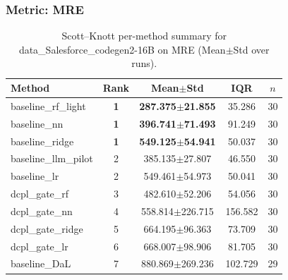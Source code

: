 \subsubsection*{Metric: MRE}
\begin{table}[H]
\centering
\scriptsize
\setlength{\tabcolsep}{4pt}
\renewcommand{\arraystretch}{1.1}
\caption{Scott--Knott per-method summary for data\_Salesforce\_codegen2-16B on MRE (Mean$\pm$Std over runs).}
\label{tab:sk_data_Salesforce_codegen2-16B_MRE}
\begin{tabular}{l|c|c|c|c}
\hline
\textbf{Method} & \textbf{Rank} & \textbf{Mean$\pm$Std} & \textbf{IQR} & \textbf{$n$} \\
\hline
\rowcolor{red!15} baseline\_rf\_light & \textbf{1} & \textbf{287.375$\pm$21.855} & 35.286 & 30 \\
\rowcolor{red!15} baseline\_nn & \textbf{1} & \textbf{396.741$\pm$71.493} & 91.249 & 30 \\
\rowcolor{red!15} baseline\_ridge & \textbf{1} & \textbf{549.125$\pm$54.941} & 50.037 & 30 \\
baseline\_llm\_pilot & 2 & 385.135$\pm$27.807 & 46.550 & 30 \\
baseline\_lr & 2 & 549.461$\pm$54.973 & 50.041 & 30 \\
dcpl\_gate\_rf & 3 & 482.610$\pm$52.206 & 54.056 & 30 \\
dcpl\_gate\_nn & 4 & 558.814$\pm$226.715 & 156.582 & 30 \\
dcpl\_gate\_ridge & 5 & 664.195$\pm$96.363 & 73.709 & 30 \\
dcpl\_gate\_lr & 6 & 668.007$\pm$98.906 & 81.705 & 30 \\
baseline\_DaL & 7 & 880.869$\pm$269.236 & 102.729 & 29 \\
\hline
\end{tabular}
\end{table}
